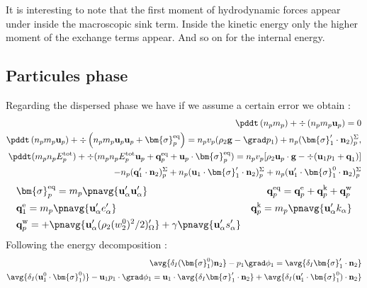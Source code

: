 It is interesting to note that the first moment of hydrodynamic forces appear under inside the macroscopic sink term. 
Inside the kinetic energy only the higher moment of the exchange terms appear. 
And so on for the internal energy. 


\subsection*{Particules phase}
Regarding the dispersed phase we have  if we assume a certain error we obtain :
\begin{align*}
    \pddt \left(n_p m_p\right)
    + \div \left(n_pm_p\textbf{u}_p
    \right)
    = 
    0\\
    \pddt \left(n_p m_p \textbf{u}_p\right)
    + \div \left(n_p
    m_p \textbf{u}_p \textbf{u}_p 
    + \bm{\sigma}_p^\text{eq}
    \right)
    = 
    n_p v_p (\rho_2 \textbf{g}
    - \grad p_1)
    + n_p (\bm{\sigma}_1' \cdot \textbf{n}_2)_p^\Sigma,\\
    \pddt(m_p n_pE_p^\text{tot})
    + \div(m_pn_p E_p^\text{tot} \textbf{u}_p 
    + \textbf{q}_p^\text{eq} 
    + \textbf{u}_p \cdot \bm{\sigma}_p^\text{eq})
    =  n_p v_p [\rho_2 \textbf{u}_p\cdot  \textbf{g}
    - \div (\textbf{u}_1 p_1 + \textbf{q}_1)]\\
    -  n_p (\textbf{q}_1' \cdot \textbf{n}_2)_p^\Sigma
    +  n_p (\textbf{u}_1 \cdot \bm{\sigma}_1' \cdot \textbf{n}_2)_p^\Sigma
    +  n_p (\textbf{u}_1' \cdot \bm{\sigma}_1^0\cdot \textbf{n}_2)_p^\Sigma
\end{align*}
\begin{align*}
    &\bm{\sigma}_p^\text{eq}
    = m_p\pnavg{\textbf{u}_\alpha'\textbf{u}_\alpha'}
    &\textbf{q}_p^\text{eq}
    =\textbf{q}_p^\text{e} 
    +\textbf{q}_p^\text{k}  
    +\textbf{q}_p^\text{w}  
    \\
    &\textbf{q}_1^\text{e}
    = m_p \pnavg{\textbf{u}_\alpha' e_\alpha'} 
    &\textbf{q}_p^\text{k}
    = m_p \pnavg{\textbf{u}_\alpha' k_\alpha} 
    \\
    &\textbf{q}_p^\text{w}
    = 
    + \pnavg{\textbf{u}_\alpha'(\rho_2 (w^0_2)^2/2 )'_\Omega}
    + \gamma \pnavg{\textbf{u}_\alpha' s_\alpha'}
\end{align*}
Following the energy decomposition : 
\begin{align*}
    \avg{\delta_I (\bm{\sigma}_1^0 ) \textbf{n}_2} - p_1 \grad \phi_1
    = 
    \avg{\delta_I \bm{\sigma}_1'\cdot \textbf{n}_2}
    \\
    \avg{\delta_I (\textbf{u}_1^0 \cdot\bm{\sigma}_1^0 )} - \textbf{u}_1p_1\cdot \grad \phi_1
    = \textbf{u}_1 \cdot \avg{\delta_I \bm{\sigma}_1'\cdot \textbf{n}_2}
    + \avg{\delta_I (\textbf{u}_1' \cdot \bm{\sigma}_1^0 )\cdot \textbf{n}_2}
\end{align*}

